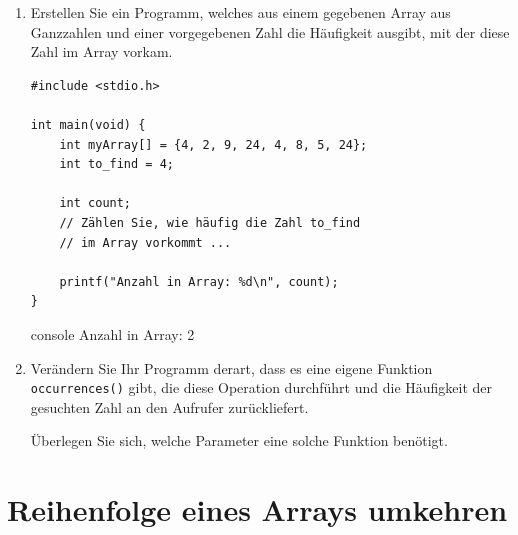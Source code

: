 \begin{enumerate}
  \item Erstellen Sie ein Programm, welches aus einem gegebenen Array aus
  Ganzzahlen und einer vorgegebenen Zahl die Häufigkeit ausgibt, mit der diese
  Zahl im Array vorkam.

\Vorlage
\begin{verbatim}
#include <stdio.h>

int main(void) {
    int myArray[] = {4, 2, 9, 24, 4, 8, 5, 24};
    int to_find = 4;

    int count;
    // Zählen Sie, wie häufig die Zahl to_find
    // im Array vorkommt ...

    printf("Anzahl in Array: %d\n", count);
}
\end{verbatim}

\begin{mybox}[Bildschirmausgabe]{console}
Anzahl in Array: 2
\end{mybox}

  \item Verändern Sie Ihr Programm derart, dass es eine eigene Funktion
  \texttt{occurrences()} gibt, die diese Operation durchführt und die
  Häufigkeit der gesuchten Zahl an den Aufrufer zurückliefert.

  Überlegen Sie sich, welche Parameter eine solche Funktion benötigt.

\end{enumerate}



\chapter{Reihenfolge eines Arrays umkehren}


